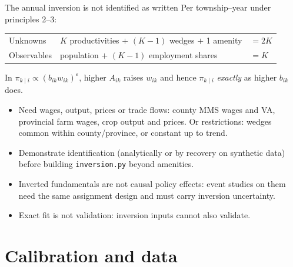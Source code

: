 \documentclass[10pt,aspectratio=169]{beamer}
\newcommand{\hl}[1]{\textcolor{mOrange}{#1}}
\begin{document}
\begin{frame}{The annual inversion is not identified as written}
  \small
  Per township--year under principles 2--3:
  \begin{center}
    \begin{tabular}{@{}lll@{}}
      \toprule
      Unknowns & $K$ productivities $+$ $(K-1)$ wedges $+$ 1 amenity & $=2K$ \\
      Observables & population $+$ $(K-1)$ employment shares & $=K$ \\
      \bottomrule
    \end{tabular}
  \end{center}
  In $\pi_{k\mid i}\propto(b_{ik}w_{ik})^{\varepsilon}$, higher $A_{ik}$ raises $w_{ik}$
  and hence $\pi_{k\mid i}$ \emph{exactly} as higher $b_{ik}$ does.
  \begin{itemize}
    \item Need wages, output, prices or trade flows: county MMS wages and VA, provincial
          farm wages, crop output and prices. Or restrictions: wedges common within
          county/province, or constant up to trend.
    \item Demonstrate identification (analytically or by recovery on synthetic data)
          \hl{before} building \texttt{inversion.py} beyond amenities.
    \item Inverted fundamentals are not causal policy effects: event studies on them need
          the same assignment design and must carry inversion uncertainty.
    \item Exact fit is not validation: inversion inputs cannot also validate.
  \end{itemize}
\end{frame}

\section{Calibration and data}
\end{document}
